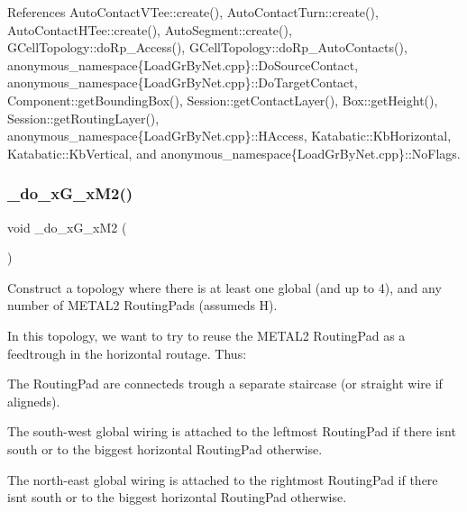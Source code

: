  

References Auto\+Contact\+V\+Tee\+::create(), Auto\+Contact\+Turn\+::create(), Auto\+Contact\+H\+Tee\+::create(), Auto\+Segment\+::create(), G\+Cell\+Topology\+::do\+Rp\+\_\+\+Access(), G\+Cell\+Topology\+::do\+Rp\+\_\+\+Auto\+Contacts(), anonymous\+\_\+namespace\{\+Load\+Gr\+By\+Net.\+cpp\}\+::\+Do\+Source\+Contact, anonymous\+\_\+namespace\{\+Load\+Gr\+By\+Net.\+cpp\}\+::\+Do\+Target\+Contact, Component\+::get\+Bounding\+Box(), Session\+::get\+Contact\+Layer(), Box\+::get\+Height(), Session\+::get\+Routing\+Layer(), anonymous\+\_\+namespace\{\+Load\+Gr\+By\+Net.\+cpp\}\+::\+H\+Access, Katabatic\+::\+Kb\+Horizontal, Katabatic\+::\+Kb\+Vertical, and anonymous\+\_\+namespace\{\+Load\+Gr\+By\+Net.\+cpp\}\+::\+No\+Flags.

\mbox{\label{group__LoadGlobalRouting_ga532d1c6b530e0375078ea2d6ea3c6024}} 
\subsubsection{\texorpdfstring{\+\_\+do\+\_\+x\+G\+\_\+x\+M2()}{\_do\_xG\_xM2()}}
{\footnotesize\ttfamily void \+\_\+do\+\_\+x\+G\+\_\+x\+M2 (\begin{DoxyParamCaption}{ }\end{DoxyParamCaption})\hspace{0.3cm}{\ttfamily [private]}}

Construct a topology where there is at least one global (and up to 4), and any number of {\ttfamily M\+E\+T\+A\+L2} Routing\+Pads (assumeds H).

In this topology, we want to try to reuse the {\ttfamily M\+E\+T\+A\+L2} Routing\+Pad as a feedtrough in the horizontal routage. Thus\+:
\begin{DoxyItemize}
\item The Routing\+Pad are connecteds trough a separate staircase (or straight wire if aligneds).
\item The south-\/west global wiring is attached to the leftmost Routing\+Pad if there isn\textquotesingle{}t south or to the biggest horizontal Routing\+Pad otherwise.
\item The north-\/east global wiring is attached to the rightmost Routing\+Pad if there isn\textquotesingle{}t south or to the biggest horizontal Routing\+Pad otherwise.
\end{DoxyItemize}

